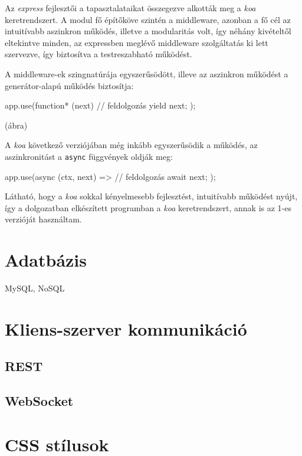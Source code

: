 Az \emph{express} fejlesztői a tapasztalataikat összegezve alkották meg a
\emph{koa} keretrendszert. A modul fő építőköve szintén a middleware, azonban a
fő cél az intuitívabb aszinkron működés, illetve a modularitás volt, így néhány
kivételtől eltekintve minden, az expressben meglévő middleware szolgáltatás ki
lett szervezve, így biztosítva a testreszabható működést.

A middleware-ek szingnatúrája egyszerűsödött, illeve az aszinkron működést a
generátor-alapú működés biztosítja:

\begin{js}
app.use(function* (next) {
  // feldolgozás
  yield next;
});
\end{js}

(ábra)

A \emph{koa} következő verziójában még inkább egyszerűsödik a működés, az
aszinkronitást a \texttt{async} függvények oldják meg:

\begin{js}
app.use(async (ctx, next) => {
  // feldolgozás
  await next;
});
\end{js}

Látható, hogy a \emph{koa} sokkal kényelmesebb fejlesztést, intuitívabb működést
nyújt, így a dolgozatban elkészített programban a \emph{koa} keretrendszert,
annak is az 1-es verzióját használtam.

\section{Adatbázis}

MySQL, NoSQL

\section{Kliens-szerver kommunikáció}

\subsection{REST}

\subsection{WebSocket}

\section{CSS stílusok}

